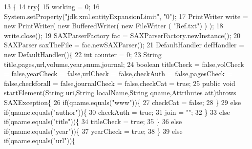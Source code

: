 \begin{DoxyCode}
13                           \{
14         \textcolor{keywordflow}{try}\{
15             \hyperlink{classXmlHandlerTitleForAuthor_aacfb0b6097f6d67493b600563cc91ec7}{working} = 0;
16             System.setProperty(\textcolor{stringliteral}{"jdk.xml.entityExpansionLimit"}, \textcolor{stringliteral}{"0"});
17             PrintWriter write = \textcolor{keyword}{new} PrintWriter( \textcolor{keyword}{new} BufferedWriter( \textcolor{keyword}{new} FileWriter ( \textcolor{stringliteral}{"Ref.txt"}) ) );
18             write.close();
19             SAXParserFactory fac = SAXParserFactory.newInstance();
20             SAXParser saxTheFile = fac.newSAXParser();
21             DefaultHandler defHandler = \textcolor{keyword}{new} DefaultHandler()\{
22                 \textcolor{keywordtype}{int} counter = 0;
23                 String title,pages,url,volume,year,snum,journal;
24                 \textcolor{keywordtype}{boolean} titleCheck = \textcolor{keyword}{false},volCheck = \textcolor{keyword}{false},yearCheck = \textcolor{keyword}{false},urlCheck = \textcolor{keyword}{false},checkAuth = \textcolor{keyword}{
      false},pagesCheck = \textcolor{keyword}{false},checkforall = \textcolor{keyword}{false},journalCheck = \textcolor{keyword}{false},checkCat = \textcolor{keyword}{true};
25                 \textcolor{keyword}{public} \textcolor{keywordtype}{void} startElement(String uri,String localName,String qname,Attributes att)\textcolor{keywordflow}{throws} 
      SAXException\{
26                     \textcolor{keywordflow}{if}(qname.equals(\textcolor{stringliteral}{"www"}))\{
27                         checkCat = \textcolor{keyword}{false};
28                     \}
29                     \textcolor{keywordflow}{else} \textcolor{keywordflow}{if}(qname.equals(\textcolor{stringliteral}{"author"}))\{
30                         checkAuth = \textcolor{keyword}{true};
31                         join = \textcolor{stringliteral}{""};
32                     \}
33                     \textcolor{keywordflow}{else} \textcolor{keywordflow}{if}(qname.equals(\textcolor{stringliteral}{"title"}))\{
34                         titleCheck = \textcolor{keyword}{true};
35                     \}
36                     \textcolor{keywordflow}{else} \textcolor{keywordflow}{if}(qname.equals(\textcolor{stringliteral}{"year"}))\{
37                         yearCheck = \textcolor{keyword}{true};
38                     \}
39                     \textcolor{keywordflow}{else} \textcolor{keywordflow}{if}(qname.equals(\textcolor{stringliteral}{"url"}))\{

\end{DoxyCode}

